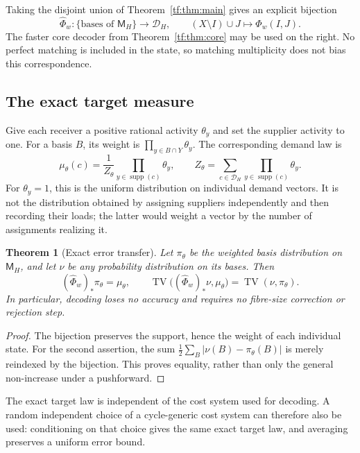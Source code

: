 \documentclass[11pt]{article}
\numberwithin{equation}{section}
\newtheorem{theorem}{Theorem}[section]
\theoremstyle{definition}
\newcommand{\supp}{\operatorname{supp}}
\newcommand{\cD}{\mathcal D}
\newcommand{\TV}{\operatorname{TV}}
\begin{document}
Taking the disjoint union of Theorem~\ref{tf:thm:main} gives an explicit
bijection
\begin{equation}
 \widehat\Phi_w:\{\text{bases of }\mathsf M_H\}\longrightarrow\cD_H,
 \qquad (X\setminus I)\cup J\longmapsto\Phi_w(I,J).
 \label{tf:eq:liftedbijection}
\end{equation}
The faster core decoder from Theorem~\ref{tf:thm:core} may be used on the
right. No perfect matching is included in the state, so matching
multiplicity does not bias this correspondence.

\subsection{The exact target measure}
Give each receiver a positive rational activity $\theta_y$ and set the
supplier activity to one. For a basis $B$, its weight is
$\prod_{y\in B\cap Y}\theta_y$. The corresponding demand law is
\begin{equation}
 \mu_\theta(c)=\frac{1}{Z_\theta}
       \prod_{y\in\supp(c)}\theta_y,
 \qquad
 Z_\theta=\sum_{c\in\cD_H}\prod_{y\in\supp(c)}\theta_y.
 \label{tf:eq:measure}
\end{equation}
For $\theta_y=1$, this is the uniform distribution on individual demand
vectors. It is not the distribution obtained by assigning suppliers
independently and then recording their loads; the latter would weight a
vector by the number of assignments realizing it.

\begin{theorem}[Exact error transfer]
\label{tf:thm:tv}
Let $\pi_\theta$ be the weighted basis distribution on $\mathsf M_H$, and let
$\nu$ be any probability distribution on its bases. Then
\begin{equation}
 (\widehat\Phi_w)_*\pi_\theta=\mu_\theta,
 \qquad
 \TV\bigl((\widehat\Phi_w)_*\nu,\mu_\theta\bigr)
 =\TV(\nu,\pi_\theta).
 \label{tf:eq:tv}
\end{equation}
In particular, decoding loses no accuracy and requires no fibre-size
correction or rejection step.
\end{theorem}
\begin{proof}
The bijection preserves the support, hence the weight of each individual
state. For the second assertion, the sum
$\frac12\sum_B|\nu(B)-\pi_\theta(B)|$ is merely reindexed by the
bijection. This proves equality, rather than only the general
non-increase under a pushforward.
\end{proof}

The exact target law is independent of the cost system used for decoding.
A random independent choice of a cycle-generic cost system can therefore
also be used: conditioning on that choice gives the same exact target
law, and averaging preserves a uniform error bound.
\end{document}
